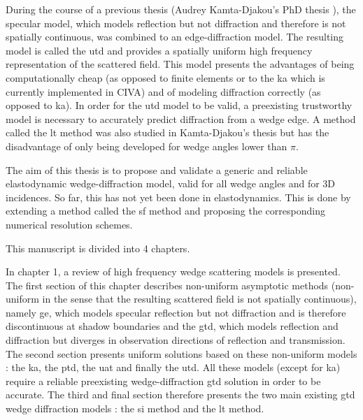 During the course of a previous thesis (Audrey Kamta-Djakou's PhD thesis \cite{AKDthese}), the specular model, which models reflection but not diffraction and therefore is not spatially continuous, was combined to an edge-diffraction model. The resulting model is called the \acrfull{utd} and provides a spatially uniform high frequency representation of the scattered field. This model presents the advantages of being computationally cheap (as opposed to finite elements or to the \acrfull{ka} which is currently implemented in CIVA) and of modeling diffraction correctly (as opposed to \acrshort{ka}). In order for the \acrshort{utd} model to be valid, a preexisting trustworthy model is necessary to accurately predict diffraction from a wedge edge. A method called the \acrfull{lt} method \cite{GautesenFradkin} was also studied in Kamta-Djakou's thesis but has the disadvantage of only being developed for wedge angles lower than $\pi$.

The aim of this thesis is to propose and validate a generic and reliable elastodynamic wedge-diffraction model, valid for all wedge angles and for 3D incidences. So far, this has not yet been done in elastodynamics. This is done by extending a method called the \acrfull{sf} method and proposing the corresponding numerical resolution schemes. 

This manuscript is divided into 4 chapters.

In chapter 1, a review of high frequency wedge scattering models is presented. The first section of this chapter describes non-uniform asymptotic methods (non-uniform in the sense that the resulting scattered field is not spatially continuous), namely \acrfull{ge}, which models specular reflection but not diffraction and is therefore discontinuous at shadow boundaries and the \acrfull{gtd}, which models reflection and diffraction but diverges in observation directions of reflection and transmission. The second section presents uniform solutions based on these non-uniform models : the \acrfull{ka}, the \acrfull{ptd}, the \acrfull{uat} and finally the \acrfull{utd}. All these models (except for \acrshort{ka}) require a reliable preexisting wedge-diffraction \acrshort{gtd} solution in order to be accurate. The third and final section therefore presents the two main existing \acrshort{gtd} wedge diffraction models : the \acrfull{si} method and the \acrfull{lt} method.

